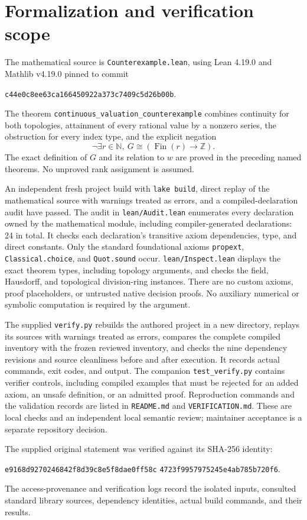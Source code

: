 \documentclass[11pt]{article}
\newcommand{\Z}{\mathbb{Z}}
\newcommand{\N}{\mathbb{N}}
\begin{document}
\section{Formalization and verification scope}

The mathematical source is \texttt{Counterexample.lean}, using Lean 4.19.0 and Mathlib
v4.19.0 pinned to commit
\begin{center}
\texttt{c44e0c8ee63ca166450922a373c7409c5d26b00b}.
\end{center}
The theorem \texttt{continuous\_valuation\_counterexample} combines continuity for both
topologies, attainment of every rational value by a nonzero series, the obstruction for every
index type, and the explicit negation
\[
 \neg\exists r\in\N,\ G\cong(\operatorname{Fin}(r)\to\Z).
\]
The exact definition of $G$ and its relation to $w$ are proved in the preceding named theorems.
No unproved rank assignment is assumed.

An independent fresh project build with \texttt{lake build}, direct replay of the mathematical
source with warnings treated as errors, and a compiled-declaration audit have passed.
The audit in \texttt{lean/Audit.lean} enumerates every declaration owned by the mathematical
module, including compiler-generated declarations: 24 in total. It checks each declaration's
transitive axiom dependencies, type, and direct constants. Only the standard foundational
axioms \texttt{propext}, \texttt{Classical.choice}, and \texttt{Quot.sound} occur.
\texttt{lean/Inspect.lean} displays the exact theorem types, including topology arguments,
and checks the field, Hausdorff, and topological division-ring instances.
There are no custom axioms, proof placeholders, or untrusted native decision proofs.
No auxiliary numerical or symbolic computation is required by the argument.

The supplied \texttt{verify.py} rebuilds the authored project in a new directory, replays its
sources with warnings treated as errors, compares the complete compiled inventory with the
frozen reviewed inventory, and checks the nine dependency revisions and source cleanliness
before and after execution. It records actual commands, exit codes, and output. The companion
\texttt{test\_verify.py} contains verifier controls, including compiled examples that must be
rejected for an added axiom, an unsafe definition, or an admitted proof. Reproduction commands
and the validation records are listed in \texttt{README.md} and \texttt{VERIFICATION.md}.
These are local checks and an independent local semantic review; maintainer acceptance is a
separate repository decision.

The supplied original statement was verified against its SHA-256 identity:
\begin{center}\small
\texttt{e9168d9270246842f8d39c8e5f8dae0ff58c}\newline
\texttt{4723f9957975245e4ab785b720f6}.
\end{center}
The access-provenance and verification logs record the isolated inputs, consulted standard
library sources, dependency identities, actual build commands, and their results.
\end{document}
